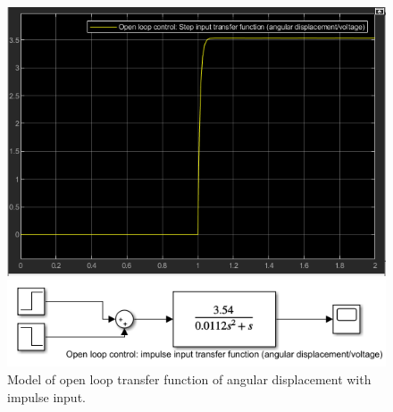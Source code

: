 \documentclass[conference]{IEEEtran}
\begin{document}
\begin{figure}[htbp]
    \centering
    \begin{minipage}[b]{0.24\textwidth}
        \includegraphics[width=\textwidth]{./Graph/G4.png}
        \caption{}
        \label{oltad1}
    \end{minipage}
    \hfill
    \begin{minipage}[b]{0.24\textwidth}
        \centering
        \includegraphics[width=\textwidth]{./Graph/G4'.png}
        \caption{Model of open loop transfer function of angular displacement with impulse input.}
    \end{minipage}
\end{figure}
\end{document}
